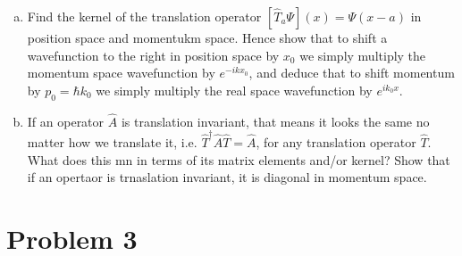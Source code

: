 \documentclass[10pt]{article}
\begin{document}
\begin{enumerate}[(a)]
        \item Find the kernel of the translation operator $[\hat T_a \Psi](x) = \Psi(x - a)$ in position space and momentukm space. Hence show that to shift a wavefunction to the right in position space by $x_0$ we simply multiply the momentum space wavefunction by $e^{-ikx_0}$, and deduce that to shift momentum by $p_0 = \hbar k_0$ we simply multiply the real space wavefunction by $e^{ik_0x}$. 
        \item If an operator $\hat A$ is translation invariant, that means it looks the same no matter how we translate it, i.e. $\hat T^\dagger \hat A \hat T = \hat A$, for any translation operator $\hat T$. What does this mn in terms of its matrix elements and/or kernel? Show that if an opertaor is trnaslation invariant, it is diagonal in momentum space.
    \end{enumerate}

    \pagebreak

    \section*{Problem 3}
\end{document}
